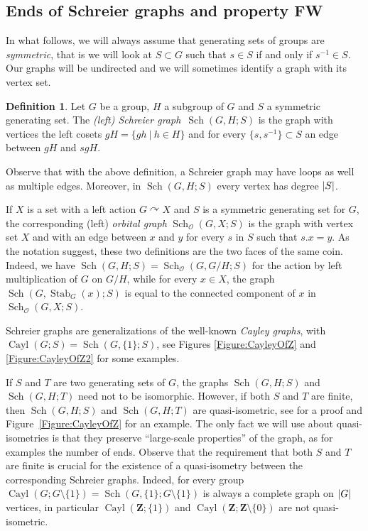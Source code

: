 \documentclass[a4paper]{article}
\theoremstyle{definition}
\newtheorem{defn}[lem]{Definition}
\theoremstyle{remark}%
\DeclareMathOperator\Cayley{Cayl}
\DeclareMathOperator\Sch{Sch}
\DeclareMathOperator\stab{Stab}
\DeclarePairedDelimiter\abs{\lvert}{\rvert}
\newcommand*{\field}[1]{\mathbf{#1}}
\newcommand*{\Z}{\field{Z}}
\newcommand{\setst}[2]{\{#1\ |\ #2\}}
\begin{document}
\subsection{Ends of Schreier graphs and property FW}
\label{Subsection:FW}
%
%
%
%
%
In what follows, we will always assume that generating sets of groups are \emph{symmetric}, that is we will look at $S\subset G$ such that $s\in S$ if and only if $s^{-1}\in S$.
Our graphs will be undirected and we will sometimes identify a graph with its vertex set.
%
%
\begin{defn}
Let $G$ be a group, $H$ a subgroup of $G$ and $S$ a symmetric generating set. The \emph{(left) Schreier graph} $\Sch(G,H;S)$ is the graph with vertices the left cosets $gH=\setst{gh}{h\in H}$ and for every $\{s,s^{-1}\}\subset S$ an edge between $gH$ and $sgH$.%
\end{defn}
%
%
Observe that with the above definition, a Schreier graph may have loops as well as multiple edges. Moreover, in $\Sch(G,H;S)$ every vertex has degree $\abs S$.

If $X$ is a set with a left action $G\curvearrowright X$ and $S$ is a symmetric generating set for $G$, the corresponding (left) \emph{orbital graph} $\Sch_{\mathcal O}(G,X;S)$ is the graph with vertex set $X$ and with an edge between $x$ and $y$ for every $s$ in $S$ such that $s.x=y$.
As the notation suggest, these two definitions are the two faces of the same coin. Indeed, we have $\Sch(G,H;S)=\Sch_{\mathcal O}(G,G/H;S)$ for the  action by left multiplication of $G$ on $G/H$, while   for every $x\in X$, the graph $\Sch(G,\stab_G(x);S)$ is equal to the connected component of $x$ in $\Sch_{\mathcal O}(G,X;S)$.

Schreier graphs are generalizations of the well-known \emph{Cayley graphs}, with $\Cayley(G;S)=\Sch(G,\{1\};S)$, see Figures \ref{Figure:CayleyOfZ} and \ref{Figure:CayleyOfZ2} for some examples.

If $S$ and $T$ are two generating sets of $G$, the graphs $\Sch(G,H;S)$ and $\Sch(G,H;T)$ need not to be isomorphic. However, if both $S$ and $T$ are finite, then $\Sch(G,H;S)$ and $\Sch(G,H;T)$ are quasi-isometric, see \cite[IV.B.21.iii]{DelaHarpe2000} for a proof and Figure~\ref{Figure:CayleyOfZ} for an example. The only fact we will use about quasi-isometries is that they preserve ``large-scale properties'' of the graph, as for examples the number of ends.
Observe that the requirement that both $S$ and $T$ are finite is crucial for the existence of a quasi-isometry between the corresponding Schreier graphs. Indeed, for every group  $\Cayley(G;G\setminus\{1\})=\Sch(G,\{1\};G\setminus\{1\})$ is always a complete graph on $\abs{G}$ vertices, in particular  $\Cayley(\Z;\{1\})$ and $\Cayley(\Z;\Z\setminus\{0\})$ are not quasi-isometric.
\end{document}
